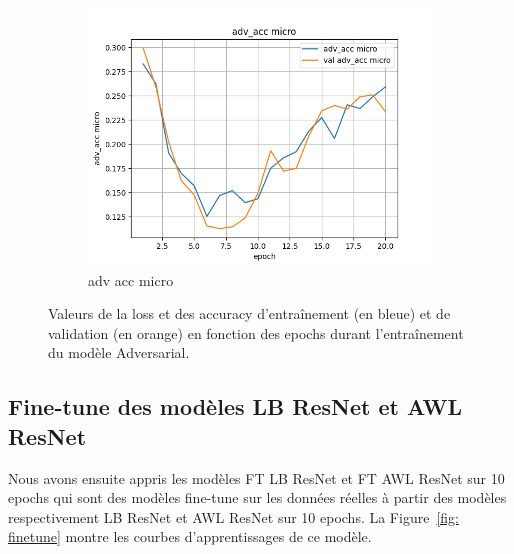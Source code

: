 \begin{figure}[ht]
\begin{subfigure}{0.32\textwidth}
        \includegraphics[width=\linewidth]{../logs/adv_img256_1/adv_acc micro.png}
        \caption{adv acc micro}
    \end{subfigure}
    \caption{Valeurs de la loss et des accuracy d'entraînement (en bleue) et de validation (en orange) en fonction des epochs durant l'entraînement du modèle Adversarial.}
    \label{fig: train adv}
\end{figure}

\subsection{Fine-tune des modèles LB ResNet et AWL ResNet}
Nous avons ensuite appris les modèles FT LB ResNet et FT AWL ResNet sur 10 epochs qui sont des modèles fine-tune sur les données réelles à partir des modèles respectivement LB ResNet et AWL ResNet sur 10 epochs. La Figure~\ref{fig: finetune} montre les courbes d'apprentissages de ce modèle.

